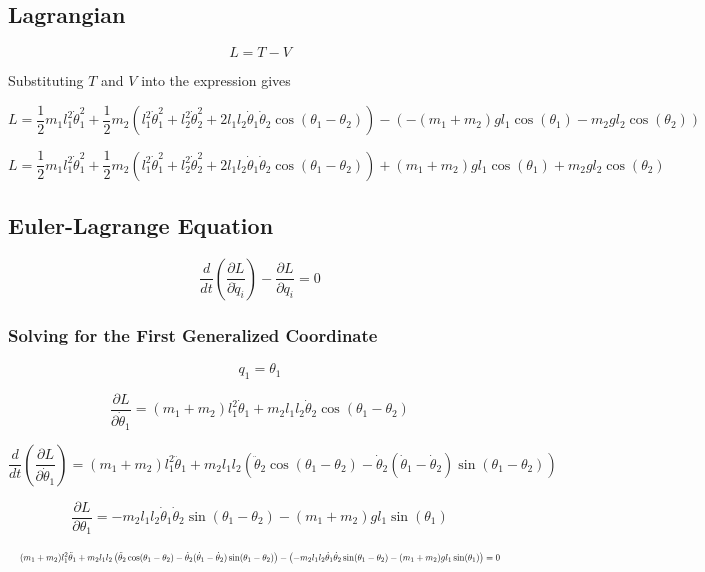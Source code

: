 \documentclass[11pt,a4paper,fleqn]{article}
\begin{document}
\newpage

\subsection{Lagrangian}

\[
    L = T - V
\]

Substituting \(T\) and \(V\) into the expression gives

\[
    L = \frac{1}{2}m_1 l_1^2 \dot{\theta}_1^2
    + \frac{1}{2}m_2\left(l_1^2 \dot{\theta}_1^2
    + l_2^2 \dot{\theta}_2^2
    + 2l_1l_2\dot{\theta}_1\dot{\theta}_2 \cos(\theta_1 - \theta_2)\right)
    - \left(-(m_1 + m_2)g l_1 \cos(\theta_1)
    - m_2 g l_2 \cos(\theta_2)\right)
\]

\[
    L = \frac{1}{2}m_1 l_1^2 \dot{\theta}_1^2
    + \frac{1}{2}m_2\left(l_1^2 \dot{\theta}_1^2
    + l_2^2 \dot{\theta}_2^2
    + 2l_1l_2\dot{\theta}_1\dot{\theta}_2 \cos(\theta_1 - \theta_2)\right)
    + (m_1 + m_2)g l_1 \cos(\theta_1)
    + m_2 g l_2 \cos(\theta_2)
\]

\subsection{Euler-Lagrange Equation}

\[
    \frac{d}{dt}\left(\frac{\partial L}{\partial \dot{q}_i}\right)
    - \frac{\partial L}{\partial q_i} = 0
\]

\subsubsection{Solving for the First Generalized Coordinate}

\[
    q_1 = \theta_1
\]

\[
    \frac{\partial L}{\partial \dot{\theta}_1}
    = (m_1 + m_2)l_1^2\dot{\theta}_1
    + m_2l_1l_2\dot{\theta}_2\cos(\theta_1 - \theta_2)
\]

\[
    \frac{d}{dt}\left(\frac{\partial L}{\partial \dot{\theta}_1}\right)
    = (m_1 + m_2)l_1^2\ddot{\theta}_1
    + m_2l_1l_2\left(
    \ddot{\theta}_2\cos(\theta_1 - \theta_2)
    - \dot{\theta}_2(\dot{\theta}_1 - \dot{\theta}_2)
    \sin(\theta_1 - \theta_2)
    \right)
\]

\[
    \frac{\partial L}{\partial \theta_1}
    = -m_2l_1l_2\dot{\theta}_1\dot{\theta}_2
    \sin(\theta_1 - \theta_2)
    - (m_1 + m_2)g l_1 \sin(\theta_1)
\]

\[
    \resizebox{\textwidth}{!}{$\displaystyle
    (m_1 + m_2)l_1^2\ddot{\theta}_1
    + m_2l_1l_2\left(
    \ddot{\theta}_2\cos(\theta_1 - \theta_2)
    - \dot{\theta}_2(\dot{\theta}_1 - \dot{\theta}_2)
    \sin(\theta_1 - \theta_2)
    \right)
    - \left(
    -m_2l_1l_2\dot{\theta}_1\dot{\theta}_2
    \sin(\theta_1 - \theta_2)
    - (m_1 + m_2)g l_1 \sin(\theta_1)
    \right) = 0$}
\]
\end{document}
